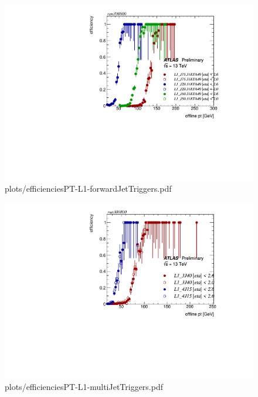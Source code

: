 \documentclass{beamer}
\begin{document}
\begin{frame}
    \begin{figure}[h]
      \centering
      \includegraphics[scale=0.50]{plots/efficienciesPT-L1-forwardJetTriggers.pdf}
      \caption{plots/efficienciesPT-L1-forwardJetTriggers.pdf}
      \label{img:1}
    \end{figure}
\end{frame}
\begin{frame}
    \begin{figure}[h]
      \centering
      \includegraphics[scale=0.50]{plots/efficienciesPT-L1-multiJetTriggers.pdf}
      \caption{plots/efficienciesPT-L1-multiJetTriggers.pdf}
      \label{img:1}
    \end{figure}
\end{frame}
\end{document}
